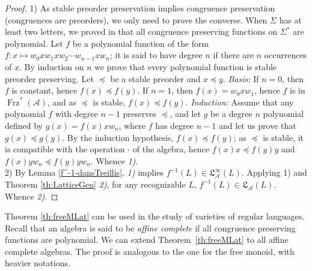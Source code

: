 \documentclass[11pt,a4paper]{article}
\theoremstyle{definition} %
\newcommand\+[1]{\mathcal{#1}} %
\newcommand{\Latt}{{\mathfrak{L}}}
\DeclareMathOperator{\freez}{Frz}%
\newcommand{\DUO}{{\freez}^*}
\begin{document}
%
\begin{proof} 1) As stable preorder preservation implies congruence preservation (congruences are preorders), we only need to prove the converse.
 When $\Sigma$ has at least two letters, we proved in \cite{acg22} that all congruence preserving functions on $\Sigma^*$ are polynomial. Let $f$ be a polynomial function  of the form  $f\colon x\mapsto w_0xw_1xw_2\cdots w_{n-1} x w_n$; it is said to have degree $n$ if there are $n$ occurrences of $x$. 
By induction on $n$ we prove that every polynomial function is stable preorder preserving. Let $\preceq$ be a stable preorder and $x\preceq y$.
{\em Basis:} If $n=0$, then $f$ is constant, hence $f(x)\preceq f(y)$. If $n=1$,  then $f(x)=w_0 x w_1$, hence $f$ is in $ \DUO(\+A)$, and as $\preceq$ is stable, $f(x)\preceq f(y)$.
{\em Induction:}  Assume that any polynomial $f$ with degree $n-1$  preserves $\preceq$,  and let $g$ be a degree $n$ polynomial defined by
$g(x) = f(x)  x w_{n}$, where $f$ has degree  $n-1$ and let us prove that $g(x)\preceq g(y)$. 
By the induction hypothesis, $f(x)\preceq f(y)$; as $\preceq$ is stable,  it is compatible with the operation $\cdot$ of the algebra, hence $f(x)x\preceq f(y)y$  and $f(x)yw_n\preceq f(y)yw_n$. Whence {\it 1)}.\\
2)  By Lemma \ref{f^-1-dansTreillis}, {\it 1)} implies $f^{-1}(L) \in \Latt_{\+A}^\infty(L)$. Applying 1) and Theorem \ref{th:LatticeGen} {\it 2)}, for any recognizable  $L$,  $f^{-1}(L)\in \Latt_{\+A}(L)$. 
Whence {\it 2)}.
  \end{proof}

 Theorem \ref{th:freeMLat} can be used in the study of varieties of regular languages.
 Recall \cite{KaarliPixley} that an algebra is said to be {\em affine complete} if all congruence preserving functions are polynomial.  
We can   extend Theorem~\ref{th:freeMLat} to all affine complete algebras. The proof is analogous to the one for the free monoid, with heavier notations.

\end{document}
